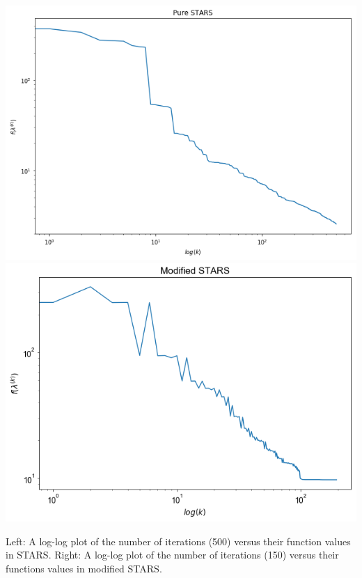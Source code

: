 \documentclass[11pt]{beamer}
\begin{document}
\begin{frame}


\begin{center}

 
\includegraphics[scale=0.25]{pure_stars.png} \includegraphics[scale=0.25]{mod_stars.png}

Left: A log-log plot of the number of iterations (500) versus their function values in STARS. Right: A log-log plot of the number of iterations (150) versus their functions values in modified STARS.

\end{center}


\end{frame}


\end{document}
